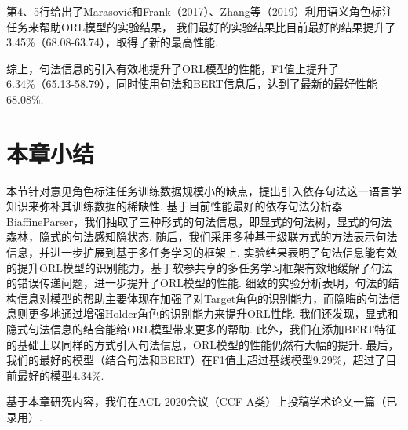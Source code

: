第4、5行给出了Marasovi{\'c}和Frank（2017）、Zhang等（2019）利用语义角色标注任务来帮助ORL模型的实验结果，
我们最好的实验结果比目前最好的结果提升了3.45\%（68.08-63.74），取得了新的最高性能.

综上，句法信息的引入有效地提升了ORL模型的性能，F1值上提升了6.34\%（65.13-58.79），同时使用句法和BERT信息后，达到了最新的最好性能68.08\%.

\section{本章小结}
本节针对意见角色标注任务训练数据规模小的缺点，提出引入依存句法这一语言学知识来弥补其训练数据的稀缺性.
基于目前性能最好的依存句法分析器BiaffineParser，我们抽取了三种形式的句法信息，即显式的句法树，显式的句法森林，隐式的句法感知隐状态.
随后，我们采用多种基于级联方式的方法表示句法信息，并进一步扩展到基于多任务学习的框架上.
实验结果表明了句法信息能有效的提升ORL模型的识别能力，基于软参共享的多任务学习框架有效地缓解了句法的错误传递问题，进一步提升了ORL模型的性能. 细致的实验分析表明，句法的结构信息对模型的帮助主要体现在加强了对Target角色的识别能力，而隐晦的句法信息则更多地通过增强Holder角色的识别能力来提升ORL性能.
我们还发现，显式和隐式句法信息的结合能给ORL模型带来更多的帮助.
此外，我们在添加BERT特征的基础上以同样的方式引入句法信息，ORL模型的性能仍然有大幅的提升.
最后，我们的最好的模型（结合句法和BERT）在F1值上超过基线模型9.29\%，超过了目前最好的模型4.34\%.

基于本章研究内容，我们在ACL-2020会议（CCF-A类）上投稿学术论文一篇（已录用）.




